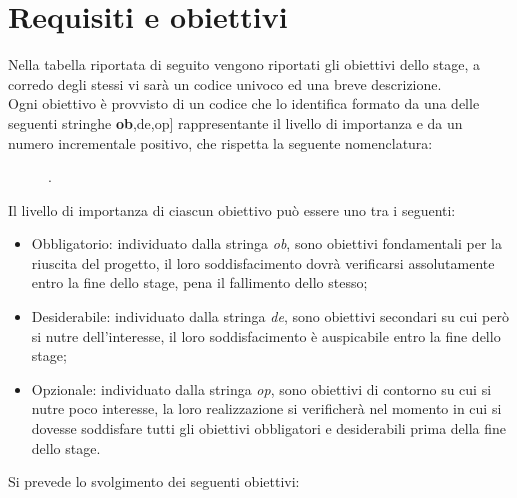 \section{Requisiti e obiettivi}
Nella tabella riportata di seguito vengono riportati gli obiettivi dello stage, a corredo degli stessi vi sarà un codice univoco ed una breve descrizione.\\
Ogni obiettivo è provvisto di un codice che lo identifica formato da una delle seguenti stringhe \textbf{ob},de,op] rappresentante il livello di importanza e da un numero incrementale positivo, che rispetta la seguente nomenclatura: 
\begin{figure}[htp]
	\centering
	[importanza][identificativo].
\end{figure}
	
Il livello di importanza di ciascun obiettivo può essere uno tra i seguenti:
\begin{itemize}
	\item Obbligatorio: individuato dalla stringa \textit{ob}, sono obiettivi fondamentali per la riuscita del progetto, il loro soddisfacimento dovrà verificarsi assolutamente entro la fine dello stage, pena il fallimento dello stesso;
	\item Desiderabile: individuato dalla stringa \textit{de}, sono obiettivi secondari su cui però si nutre dell'interesse, il loro soddisfacimento è auspicabile entro la fine dello stage;
	\item Opzionale: individuato dalla stringa \textit{op}, sono obiettivi di contorno su cui si nutre poco interesse, la loro realizzazione si verificherà nel momento in cui si dovesse soddisfare tutti gli obiettivi obbligatori e desiderabili prima della fine dello stage.
\end{itemize}
Si prevede lo svolgimento dei seguenti obiettivi:
